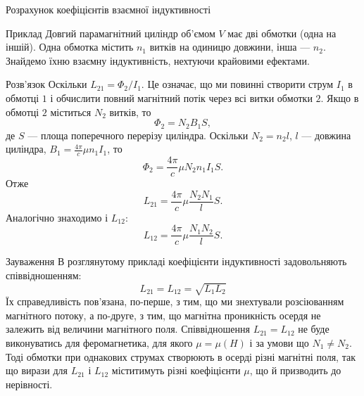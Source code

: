\documentclass[onlytextwidth]{beamer}
\begin{document}
\begin{frame}{Розрахунок коефіцієнтів взаємної індуктивності}{}\small
	\begin{exampleblock}{Приклад}\justifying
		Довгий парамагнітний циліндр об'ємом $V$ має дві обмотки (одна на іншій). Одна обмотка містить $n_1$ витків на одиницю довжини, інша ---
		$n_2$. Знайдемо їхню взаємну індуктивність, нехтуючи крайовими ефектами.
	\end{exampleblock}

	\begin{overprint}
		\begin{block}{Розв'язок}\justifying
			Оскільки $L_{21} = \Phi_2 / I_1$. Це означає, що ми повинні створити струм $I_1$ в обмотці $1$ і обчислити повний магнітний потік через всі витки
			обмотки $2$. Якщо в обмотці $2$ міститься $N_2$ витків, то
			\[
				\Phi_2 = N_2 B_1 S,
			\]
			де $S$ --- площа поперечного перерізу циліндра. Оскільки $N_2 = n_2 l$, $l$ --- довжина циліндра, $B_1 = \frac{4\pi}{c} \mu n_1 I_1$, то
			\[
				\Phi_2 =  \frac{4\pi}{c} \mu N_2 n_1 I_1 S.
			\]
			Отже
			\[
				L_{21} = \frac{4\pi}{c} \mu \frac{N_2 N_1}{l} S.
			\]
			Аналогічно знаходимо і $L_{12}$:
			\[
				L_{12} = \frac{4\pi}{c} \mu \frac{N_1 N_2}{l} S.
			\]
		\end{block}
		\begin{block}{Зауваження}\justifying
			В розглянутому прикладі коефіцієнти індуктивності задовольняють співвідношенням:
			\begin{equation*}
				L_{21} = L_{12} = \sqrt{L_1L_2}
			\end{equation*}
			Їх справедливість пов'язана, по-перше, з тим, що ми знехтували розсіюванням магнітного потоку, а по-друге, з тим, що магнітна проникність осердя не
			залежить від величини магнітного поля. Співвідношення $L_{21} = L_{12}$ не буде виконуватись для феромагнетика, для якого  $\mu = \mu(H)$ і за умови що
			$N_1 \neq N_2$. Тоді обмотки при однакових струмах створюють в осерді різні магнітні поля, так що вирази для $L_{21}$ і $L_{12}$ міститимуть різні
			коефіцієнти $\mu$, що й
			призводить до нерівності.
		\end{block}
	\end{overprint}
\end{frame}
\end{document}
